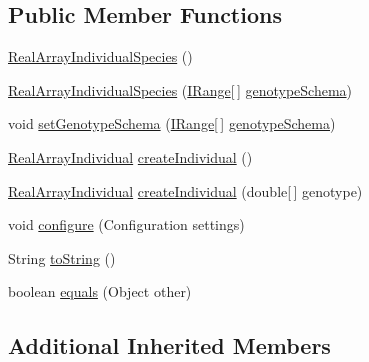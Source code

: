 \subsection*{Public Member Functions}
\begin{DoxyCompactItemize}
\item 
\hyperlink{classnet_1_1sf_1_1jclec_1_1realarray_1_1_real_array_individual_species_abcb06782f4f528c31b79280dc340f6d1}{Real\-Array\-Individual\-Species} ()
\item 
\hyperlink{classnet_1_1sf_1_1jclec_1_1realarray_1_1_real_array_individual_species_ab5f22a21aff7dda2ed3d356f67a3ed30}{Real\-Array\-Individual\-Species} (\hyperlink{interfacenet_1_1sf_1_1jclec_1_1util_1_1range_1_1_i_range}{I\-Range}\mbox{[}$\,$\mbox{]} \hyperlink{classnet_1_1sf_1_1jclec_1_1realarray_1_1_real_array_species_a97f34d721e8108eed41e9196ab9fdebf}{genotype\-Schema})
\item 
void \hyperlink{classnet_1_1sf_1_1jclec_1_1realarray_1_1_real_array_individual_species_ad4e69ca4fd3f279976ad802183d07561}{set\-Genotype\-Schema} (\hyperlink{interfacenet_1_1sf_1_1jclec_1_1util_1_1range_1_1_i_range}{I\-Range}\mbox{[}$\,$\mbox{]} \hyperlink{classnet_1_1sf_1_1jclec_1_1realarray_1_1_real_array_species_a97f34d721e8108eed41e9196ab9fdebf}{genotype\-Schema})
\item 
\hyperlink{classnet_1_1sf_1_1jclec_1_1realarray_1_1_real_array_individual}{Real\-Array\-Individual} \hyperlink{classnet_1_1sf_1_1jclec_1_1realarray_1_1_real_array_individual_species_abe454d2029d5a75fdef253f7a3b08274}{create\-Individual} ()
\item 
\hyperlink{classnet_1_1sf_1_1jclec_1_1realarray_1_1_real_array_individual}{Real\-Array\-Individual} \hyperlink{classnet_1_1sf_1_1jclec_1_1realarray_1_1_real_array_individual_species_aae87aa43f2c60820bb9faec818a9174c}{create\-Individual} (double\mbox{[}$\,$\mbox{]} genotype)
\item 
void \hyperlink{classnet_1_1sf_1_1jclec_1_1realarray_1_1_real_array_individual_species_a914c60befef252f97a5287a6bf22cba1}{configure} (Configuration settings)
\item 
String \hyperlink{classnet_1_1sf_1_1jclec_1_1realarray_1_1_real_array_individual_species_af15482354a11618b397222a689f405a1}{to\-String} ()
\item 
boolean \hyperlink{classnet_1_1sf_1_1jclec_1_1realarray_1_1_real_array_individual_species_a033852afa9e1d1f0f6f3d8d3286580c6}{equals} (Object other)
\end{DoxyCompactItemize}
\subsection*{Additional Inherited Members}


